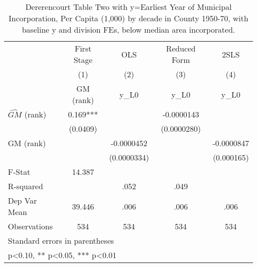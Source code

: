 \begin{table}[htbp]\centering
\def\sym#1{\ifmmode^{#1}\else\(^{#1}\)\fi}
\caption{Dererencourt Table Two with y=Earliest Year of Municipal Incorporation, Per Capita (1,000) by decade in County 1950-70, with baseline y and division FEs, below median area incorporated.}
\begin{tabular}{l*{4}{c}}
\toprule
                    & First Stage   &         OLS   &Reduced Form   &        2SLS   \\
                    &\multicolumn{1}{c}{(1)}&\multicolumn{1}{c}{(2)}&\multicolumn{1}{c}{(3)}&\multicolumn{1}{c}{(4)}\\
                    &\multicolumn{1}{c}{GM  (rank)}&\multicolumn{1}{c}{y\_L0}&\multicolumn{1}{c}{y\_L0}&\multicolumn{1}{c}{y\_L0}\\
\midrule
$\hat{GM}$ (rank)   &       0.169***&               &  -0.0000143   &               \\
                    &    (0.0409)   &               & (0.0000280)   &               \\
\addlinespace
GM  (rank)          &               &  -0.0000452   &               &  -0.0000847   \\
                    &               & (0.0000334)   &               &  (0.000165)   \\
\midrule
F-Stat              &      14.387   &               &               &               \\
R-squared           &               &        .052   &        .049   &               \\
Dep Var Mean        &      39.446   &        .006   &        .006   &        .006   \\
Observations        &         534   &         534   &         534   &         534   \\
\bottomrule
\multicolumn{5}{l}{\footnotesize Standard errors in parentheses}\\
\multicolumn{5}{l}{\footnotesize * p<0.10, ** p<0.05, *** p<0.01}\\
\end{tabular}
\end{table}
